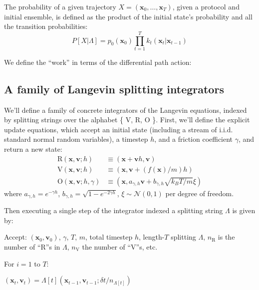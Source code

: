 \documentclass[11pt]{article}
\newcommand{\x}{\mathbf{x}}
\newcommand{\vel}{\mathbf{v}}
\begin{document}
The probability of a given trajectory $X = (\x_0, \dots, \x_T)$, given a protocol and initial ensemble, is defined as the product of the initial state's probability and all the transition probabilities:
$$P[X | \Lambda] = p_0 (\x_0) \prod_{t=1}^T k_t(\x_t | \x_{t-1})$$

We define the ``work'' in terms of the differential path action:



\subsection{A family of Langevin splitting integrators}
We'll define a family of concrete integrators of the Langevin equations, indexed by splitting strings over the alphabet \{ V, R, O \}.
First, we'll define the explicit update equations, which accept an initial state (including a stream of i.i.d. standard normal random variables), a timestep $h$, and a friction coefficient $\gamma$, and return a new state:
$$\begin{aligned}
\text{R}(\x, \vel ; h) &\equiv (\x + \vel h, \vel) \\
\text{V}(\x, \vel ; h) &\equiv (\x, \vel + (f(\x) / m) h) \\
\text{O}(\x, \vel ; h, \gamma) &\equiv (\x, a_{\gamma, h} \vel + b_{\gamma, h} \sqrt{k_B T / m} \xi)\end{aligned}$$
where $a_{\gamma, h} = e^{-\gamma h}$,
$b_{\gamma, h} = \sqrt{1 - e^{-2 \gamma h}}$,
$\xi \sim \mathcal{N}(0, 1)$ per degree of freedom.

Then executing a single step of the integrator indexed a splitting string $\Lambda$ is given by:

Accept: $(\x_0, \vel_0)$, $\gamma$, $T$, $m$, total timestep $h$, length-$T$ splitting $\Lambda$,
$n_\text{R}$ is the number of ``R''s in $\Lambda$, $n_\text{V}$ the number of ``V''s, etc.

For $i=1$ to $T$:

$(\x_t, \vel_t) = \Lambda[t](\x_{t-1}, \vel_{t-1} ; \delta t / n_{\Lambda[t]}) $
\end{document}
